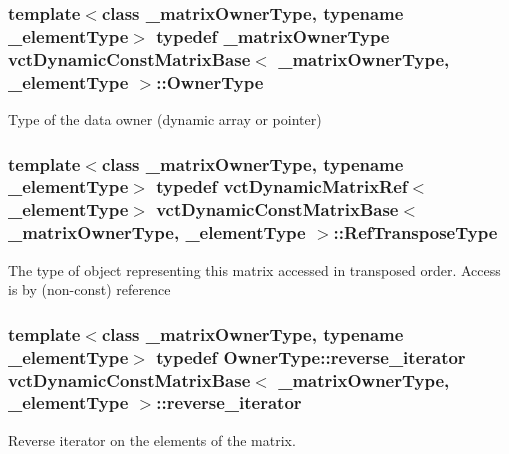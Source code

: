 \subsubsection[{Owner\+Type}]{\setlength{\rightskip}{0pt plus 5cm}template$<$class \+\_\+matrix\+Owner\+Type, typename \+\_\+element\+Type$>$ typedef \+\_\+matrix\+Owner\+Type {\bf vct\+Dynamic\+Const\+Matrix\+Base}$<$ \+\_\+matrix\+Owner\+Type, \+\_\+element\+Type $>$\+::{\bf Owner\+Type}}\label{classvct_dynamic_const_matrix_base_a2e37ebc2ac741d4346d21f986e625e96}
Type of the data owner (dynamic array or pointer) \hypertarget{classvct_dynamic_const_matrix_base_afff0f3bee56a8562e0ec772b35e24475}{}
\subsubsection[{Ref\+Transpose\+Type}]{\setlength{\rightskip}{0pt plus 5cm}template$<$class \+\_\+matrix\+Owner\+Type, typename \+\_\+element\+Type$>$ typedef {\bf vct\+Dynamic\+Matrix\+Ref}$<$\+\_\+element\+Type$>$ {\bf vct\+Dynamic\+Const\+Matrix\+Base}$<$ \+\_\+matrix\+Owner\+Type, \+\_\+element\+Type $>$\+::{\bf Ref\+Transpose\+Type}}\label{classvct_dynamic_const_matrix_base_afff0f3bee56a8562e0ec772b35e24475}
The type of object representing this matrix accessed in transposed order. Access is by (non-\/const) reference \hypertarget{classvct_dynamic_const_matrix_base_a53905f35527b9ce433c246ab50a6b812}{}
\subsubsection[{reverse\+\_\+iterator}]{\setlength{\rightskip}{0pt plus 5cm}template$<$class \+\_\+matrix\+Owner\+Type, typename \+\_\+element\+Type$>$ typedef Owner\+Type\+::reverse\+\_\+iterator {\bf vct\+Dynamic\+Const\+Matrix\+Base}$<$ \+\_\+matrix\+Owner\+Type, \+\_\+element\+Type $>$\+::{\bf reverse\+\_\+iterator}}\label{classvct_dynamic_const_matrix_base_a53905f35527b9ce433c246ab50a6b812}
Reverse iterator on the elements of the matrix. \hypertarget{classvct_dynamic_const_matrix_base_a15b845e745a76559d730ecef10a991b7}{}
